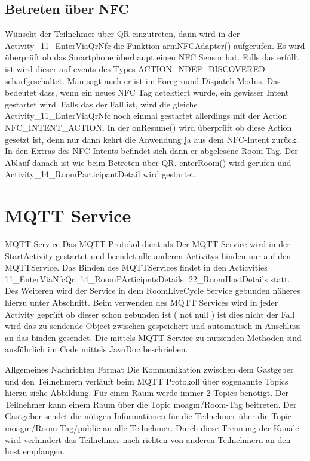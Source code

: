 \subsection{Betreten über NFC}
\label{subsec: Betreten über NFC}
Wünscht der Teilnehmer über QR einzutreten, dann wird in der Activity\_11\_EnterViaQrNfc die Funktion armNFCAdapter() aufgerufen. Es wird überprüft ob das Smartphone überhaupt einen NFC Sensor hat.
Falls das erfüllt ist wird dieser auf events des Types ACTION\_NDEF\_DISCOVERED scharfgeschaltet. 
Man sagt auch er ist im Foreground-Dispatch-Modus.
Das bedeutet dass, wenn ein neues NFC Tag detektiert wurde, ein gewisser Intent gestartet wird. 
Falls das der Fall ist, wird die gleiche Activity\_11\_EnterViaQrNfc noch einmal gestartet allerdings mit der Action NFC\_INTENT\_ACTION. 
In der onResume() wird überprüft ob diese Action gesetzt ist, denn nur dann kehrt die Anwendung ja aus dem NFC-Intent zurück. 
In den Extras des NFC-Intents befindet sich dann er abgelesene Room-Tag. Der Ablauf danach ist wie beim Betreten über QR. enterRoom() wird gerufen und Activity\_14\_RoomParticipantDetail wird gestartet.
\section{MQTT Service}
MQTT Service
Das MQTT Protokol dient als 
Der MQTT Service wird in der StartActivity gestartet und beendet alle anderen Activitys binden nur auf den MQTTService. Das Binden des MQTTServices findet in den Acticvities 11\_EnterViaNfcQr, 14\_RoomPArticipntsDetails, 22\_RoomHostDetails statt. Des Weiteren wird der Service in dem RoomLiveCycle Service gebunden näheres hierzu unter Abschnitt.  Beim verwenden des MQTT Services wird in jeder Activity geprüft ob dieser schon gebunden ist ( not null ) ist dies nicht der Fall wird das zu sendende Object zwischen gespeichert und automatisch in Anschluss an das binden gesendet. 
Die mittels MQTT Service zu nutzenden Methoden sind ausführlich im Code mittels JavaDoc beschrieben. 

Allgemeines Nachrichten Format 
Die Kommunikation zwischen dem Gastgeber und den Teilnehmern verläuft beim MQTT Protokoll über sogenannte Topics hierzu siehe Abbildung. Für einen Raum werde immer 2 Topics benötigt. Der Teilnehmer kann einem Raum über die Topic moagm/Room-Tag beitreten. Der Gastgeber sendet die nötigen Informationen für die Teilnehmer über die Topic moagm/Room-Tag/public an alle Teilnehmer. Durch diese Trennung der Kanäle wird verhindert das Teilnehmer nach richten von anderen Teilnehmern an den host empfangen.

